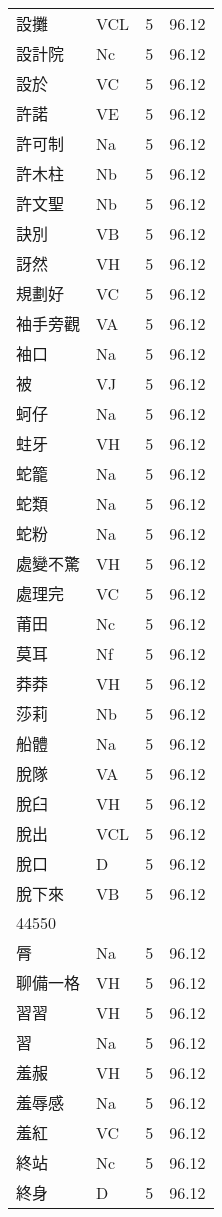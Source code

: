 \documentclass[twocolumn]{book}
\begin{document}
\begin{supertabular}{llrr}
設攤 & VCL & 5 &  96.12\\
設計院 & Nc & 5 &  96.12\\
設於 & VC & 5 &  96.12\\
許諾 & VE & 5 &  96.12\\
許可制 & Na & 5 &  96.12\\
許木柱 & Nb & 5 &  96.12\\
許文聖 & Nb & 5 &  96.12\\
訣別 & VB & 5 &  96.12\\
訝然 & VH & 5 &  96.12\\
規劃好 & VC & 5 &  96.12\\
袖手旁觀 & VA & 5 &  96.12\\
袖口 & Na & 5 &  96.12\\
被 & VJ & 5 &  96.12\\
蚵仔 & Na & 5 &  96.12\\
蛀牙 & VH & 5 &  96.12\\
蛇籠 & Na & 5 &  96.12\\
蛇類 & Na & 5 &  96.12\\
蛇粉 & Na & 5 &  96.12\\
處變不驚 & VH & 5 &  96.12\\
處理完 & VC & 5 &  96.12\\
莆田 & Nc & 5 &  96.12\\
莫耳 & Nf & 5 &  96.12\\
莽莽 & VH & 5 &  96.12\\
莎莉 & Nb & 5 &  96.12\\
船體 & Na & 5 &  96.12\\
脫隊 & VA & 5 &  96.12\\
脫臼 & VH & 5 &  96.12\\
脫出 & VCL & 5 &  96.12\\
脫口 & D & 5 &  96.12\\
脫下來 & VB & 5 &  96.12\\
44550\\
脣 & Na & 5 &  96.12\\
聊備一格 & VH & 5 &  96.12\\
習習 & VH & 5 &  96.12\\
習 & Na & 5 &  96.12\\
羞赧 & VH & 5 &  96.12\\
羞辱感 & Na & 5 &  96.12\\
羞紅 & VC & 5 &  96.12\\
終站 & Nc & 5 &  96.12\\
終身 & D & 5 &  96.12\\

\end{supertabular}
\end{document}
